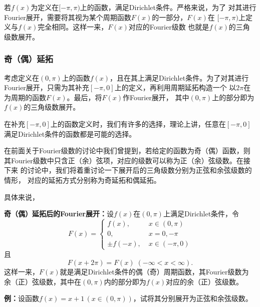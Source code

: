 若$f(x)$为定义在$[-\pi,\pi)$上的函数，满足Dirichlet条件。严格来说，为了
对其进行Fourier展开，需要将其视为某个周期函数$F(x)$的一部分，$F(x)$在
$[-\pi,\pi)$上定义与$f(x)$完全相同。这样一来，$F(x)$对应的Fourier级数
也就是$f(x)$的三角级数展开。

\subsubsection{奇（偶）延拓}

考虑定义在$(0,\pi)$上的函数$f(x)$，且在其上满足Dirichlet条件。为了对其进行
Fourier展开，只需为其补充$[-\pi,0]$上的定义，再利用周期延拓构造一个
以$2\pi$在为周期的函数$F(x)$。最后，将$F(x)$作Fourier展开，
其中$(0,\pi)$上的部分即为$f(x)$的三角级数展开。

在补充$[-\pi,0]$上的函数定义时，我们有许多的选择，理论上讲，任意在$[-\pi,0]$
满足Dirichlet条件的函数都是可能的选择。

在前面关于Fourier级数的讨论中我们曾提到，若给定的函数为奇（偶）函数，则
其Fourier级数中只含正（余）弦项，对应的级数可以称为正（余）弦级数。在接下来
的讨论中，我们将着重讨论一下展开后的三角级数分别为正弦和余弦级数的情形，
对应的延拓方式分别称为奇延拓和偶延拓。

具体来说，

\begin{thx}
	{\bf 奇（偶）延拓后的Fourier展开：}设$f(x)$在$(0,\pi)$上满足Dirichlet条件，令
	$$F(x)=\left\{\begin{array}{ll}
	  	f(x),\;& x\in(0,\pi)\\
	  	0,\;& x=0,-\pi\\
	  	\pm f(-x),\;& x\in(-\pi,0)
	  \end{array}\right.$$
	且
	  $$F(x+2\pi)=F(x)\;(-\infty<x<\infty).$$
	这样一来，$F(x)$就是满足Dirichlet条件的偶（奇）周期函数，其Fourier级数为
	余（正）弦级数，其中在$(0,\pi)$内的部分即为$f(x)$对应的余（正）弦级数。
\end{thx}

{\bf 例：}设函数$f(x)=x+1\,(x\in(0,\pi))$，试将其分别展开为正弦和余弦级数。

\begin{center}
	
\end{center}


